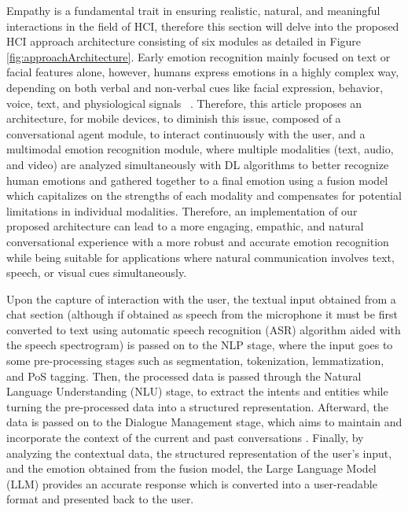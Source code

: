 \documentclass[runningheads]{llncs}
\begin{document}
Empathy is a fundamental trait in ensuring realistic, natural, and meaningful interactions in the field of HCI, therefore this section will delve into the proposed HCI approach architecture consisting of six modules as detailed in Figure \ref{fig:approachArchitecture}. Early emotion recognition mainly focused on text or facial features alone, however, humans express emotions in a highly complex way, depending on both verbal and non-verbal cues like facial expression, behavior, voice, text, and physiological signals \cite{ezzameli_emotion_2023}~\cite{zhu_multimodal_2023}. Therefore, this article proposes an architecture, for mobile devices, to diminish this issue, composed of a conversational agent module, to interact continuously with the user, and a multimodal emotion recognition module, where multiple modalities (text, audio, and video) are analyzed simultaneously with DL algorithms to better recognize human emotions and gathered together to a final emotion using a fusion model which capitalizes on the strengths of each modality and compensates for potential limitations in individual modalities. Therefore, an implementation of our proposed architecture can lead to a more engaging, empathic, and natural conversational experience with a more robust and accurate emotion recognition while being suitable for applications where natural communication involves text, speech, or visual cues simultaneously.

Upon the capture of interaction with the user, the textual input obtained from a chat section (although if obtained as speech from the microphone it must be first converted to text using automatic speech recognition (ASR) algorithm aided with the speech spectrogram) is passed on to the NLP stage, where the input goes to some pre-processing stages such as segmentation, tokenization, lemmatization, and PoS tagging. Then, the processed data is passed through the Natural Language Understanding (NLU) stage, to extract the intents and entities while turning the pre-processed data into a structured representation. Afterward, the data is passed on to the Dialogue Management stage, which aims to maintain and incorporate the context of the current and past conversations \cite{rizou_multilingual_2022}. Finally, by analyzing the contextual data, the structured representation of the user's input, and the emotion obtained from the fusion model, the Large Language Model (LLM) provides an accurate response which is converted into a user-readable format and presented back to the user.
\end{document}
